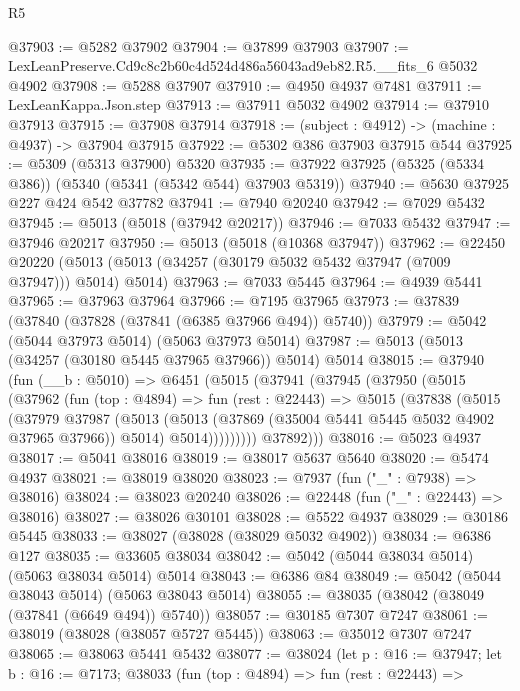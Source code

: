 \begin{lexlean}{R5}
\begin{coremodule}
@37903 := @5282 @37902
@37904 := @37899 @37903
@37907 := LexLeanPreserve.Cd9c8c2b60c4d524d486a56043ad9eb82.R5.__fits_6 @5032 @4902
@37908 := @5288 @37907
@37910 := @4950 @4937 @7481
@37911 := LexLeanKappa.Json.step
@37913 := @37911 @5032 @4902
@37914 := @37910 @37913
@37915 := @37908 @37914
@37918 := (subject : @4912) -> (machine : @4937) -> @37904 @37915
@37922 := @5302 @386 @37903 @37915 @544
@37925 := @5309 (@5313 @37900) @5320
@37935 := @37922 @37925 (@5325 (@5334 @386)) (@5340 (@5341 (@5342 @544) @37903 @5319))
@37940 := @5630 @37925 @227 @424 @542 @37782
@37941 := @7940 @20240
@37942 := @7029 @5432
@37945 := @5013 (@5018 (@37942 @20217))
@37946 := @7033 @5432
@37947 := @37946 @20217
@37950 := @5013 (@5018 (@10368 @37947))
@37962 := @22450
    @20220
    (@5013 (@5013 (@34257 (@30179 @5032 @5432 @37947 (@7009 @37947))) @5014) @5014)
@37963 := @7033 @5445
@37964 := @4939 @5441
@37965 := @37963 @37964
@37966 := @7195 @37965
@37973 := @37839 (@37840 (@37828 (@37841 (@6385 @37966 @494)) @5740))
@37979 := @5042 (@5044 @37973 @5014) (@5063 @37973 @5014)
@37987 := @5013 (@5013 (@34257 (@30180 @5445 @37965 @37966)) @5014) @5014
@38015 := @37940
    (fun (__b : @5010) =>
    @6451
      (@5015
        (@37941
          (@37945
            (@37950
              (@5015
                (@37962
                  (fun (top : @4894) =>
                  fun (rest : @22443) =>
                  @5015
                    (@37838
                      (@5015
                        (@37979
                          @37987
                          (@5013
                            (@5013 (@37869 (@35004 @5441 @5445 @5032 @4902 @37965 @37966)) @5014)
                            @5014)))))))))
          @37892)))
@38016 := @5023 @4937
@38017 := @5041 @38016
@38019 := @38017 @5637 @5640
@38020 := @5474 @4937
@38021 := @38019 @38020
@38023 := @7937 (fun ("_" : @7938) => @38016)
@38024 := @38023 @20240
@38026 := @22448 (fun ("_" : @22443) => @38016)
@38027 := @38026 @30101
@38028 := @5522 @4937
@38029 := @30186 @5445
@38033 := @38027 (@38028 (@38029 @5032 @4902))
@38034 := @6386 @127
@38035 := @33605 @38034
@38042 := @5042 (@5044 @38034 @5014) (@5063 @38034 @5014) @5014
@38043 := @6386 @84
@38049 := @5042 (@5044 @38043 @5014) (@5063 @38043 @5014)
@38055 := @38035 (@38042 (@38049 (@37841 (@6649 @494)) @5740))
@38057 := @30185 @7307 @7247
@38061 := @38019 (@38028 (@38057 @5727 @5445))
@38063 := @35012 @7307 @7247
@38065 := @38063 @5441 @5432
@38077 := @38024
    (let p : @16 := @37947;
    let b : @16 := @7173;
    @38033
      (fun (top : @4894) =>
      fun (rest : @22443) =>

\end{coremodule}
\end{lexlean}
